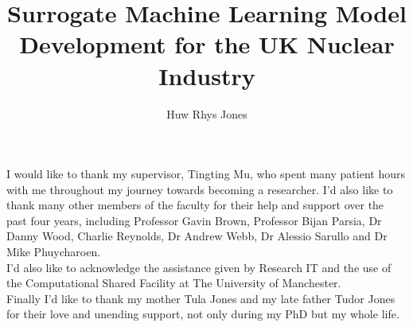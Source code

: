 \documentclass[12pt,PhD,wordcount,anon]{muthesis}
\begin{document}

\title{Surrogate Machine Learning Model Development for the UK Nuclear Industry}
\author{Huw Rhys Jones}

\beforeabstract



\afterabstract

I would like to thank my supervisor, Tingting Mu, who spent many patient hours with me throughout my journey towards becoming a researcher. I'd also like to thank many other members of the faculty for their help and support over the past four years, including Professor Gavin Brown, Professor Bijan Parsia, Dr Danny Wood, Charlie Reynolds, Dr Andrew Webb, Dr Alessio Sarullo and Dr Mike Phuycharoen. 
\\

\noindent
I'd also like to acknowledge the assistance
given by Research IT and the use of the Computational
Shared Facility at The University of Manchester.
\\

\noindent
Finally I'd like to thank my mother Tula Jones and my late father Tudor Jones for their love and unending support, not only during my PhD but my whole life.
\afterpreface













\end{document}
